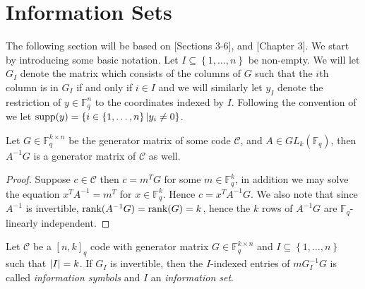 \section{Information Sets}\label{sec:information_set_decoding}
The following section will be based on \cite{information_set_decoding}[Sections 3-6], \cite{lee_brickell} and \cite{notes_on_code_based_cryptography}[Chapter 3]. We start by introducing some basic notation. Let $I \subseteq \left\{1, \ldots, n\right\}$ be non-empty. We will let $G_I$ denote the matrix which consists of the columns of $G$ such that the $i$th column is in $G_I$ if and only if $i \in I$ and we will similarly let $y_I$ denote the restriction of $y \in \mathbb{F}_q^n$ to the coordinates indexed by $I$. Following the convention of \cite{notes_on_code_based_cryptography} we let $\textnormal{supp}(y) = \left\{i \in \left\{1, \ldots, n\right\} | y_i \neq 0 \right\}$.

\begin{proposition}\label{prop:multiplying_by_information_matrix_generates_the_same_code}
  Let $G \in \mathbb{F}_q^{k \times n}$ be the generator matrix of some code $\mathcal{C}$, and $A \in GL_k(\mathbb{F}_q)$, then $A^{-1}G$ is a generator matrix of $\mathcal{C}$ as well.
\end{proposition}
\begin{proof}
  Suppose $c \in \mathcal{C}$ then $c = m^TG$ for some $m \in \mathbb{F}_q^{k}$, in addition we may solve the equation $x^TA^{-1} = m^{T}$ for $x \in \mathbb{F}^k_q$. Hence $c = x^TA^{-1}G$. We also note that since $A^{-1}$ is invertible, $\textnormal{rank}(A^{-1}G) = \textnormal{rank}(G) = k$, hence the $k$ rows of $A^{-1}G$ are $\mathbb{F}_q$-linearly independent.
\end{proof}

\begin{definition}
  Let $\mathcal{C}$ be a $[n, k]_q$ code with generator matrix $G \in \mathbb{F}_q^{k \times n}$ and $I \subseteq \left\{1, \ldots, n\right\}$ such that $\left\lvert I\right\rvert = k$. If $G_I$ is invertible, then the $I$-indexed entries of $mG^{-1}_I G$ is called \textit{information symbols} and $I$ an \textit{information set}.
\end{definition}

